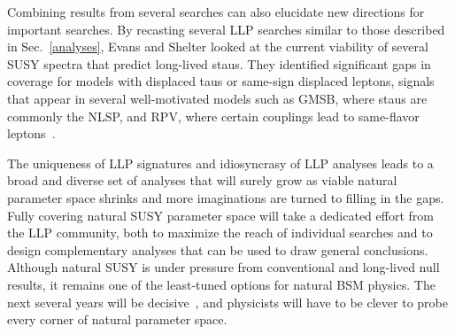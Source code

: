 \documentclass[12pt]{article}
\begin{document}
    Combining results from several searches can also elucidate new directions for important searches. By recasting several LLP searches similar to those described in Sec.~\ref{analyses}, Evans and Shelter looked at the current viability of several SUSY spectra that predict long-lived staus. They identified significant gaps in coverage for models with displaced taus or same-sign displaced leptons, signals that appear in several well-motivated models such as GMSB, where staus are commonly the NLSP, and RPV, where certain couplings lead to same-flavor leptons~\cite{ll_staus}. 

    The uniqueness of LLP signatures and idiosyncrasy of LLP analyses leads to a broad and diverse set of analyses that will surely grow as viable natural parameter space shrinks and more imaginations are turned to filling in the gaps. Fully covering natural SUSY parameter space will take a dedicated effort from the LLP community, both to maximize the reach of individual searches and to design complementary analyses that can be used to draw general conclusions. Although natural SUSY is under pressure from conventional and long-lived null results, it remains one of the least-tuned options for natural BSM physics. The next several years will be decisive~\cite{cornering}, and physicists will have to be clever to probe every corner of natural parameter space.

\clearpage
\pagebreak
\singlespacing
{}

\end{document}

